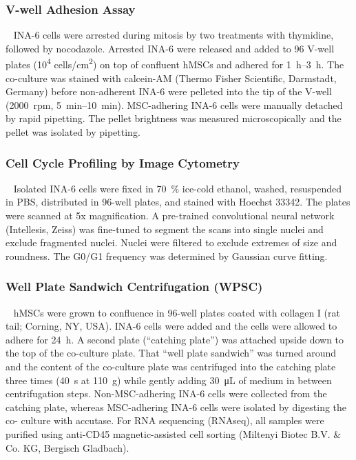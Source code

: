 \subsubsection*{V-well Adhesion Assay}
\ %
INA-6 cells were arrested during mitosis by two treatments with thymidine, followed by
nocodazole. Arrested INA-6 were released and added to 96 V-well plates (10\textsuperscript{4}
cells/cm\textsuperscript{2}) on
top of confluent hMSCs and adhered for \SIrange{1}{3}{\hour}. The co-culture was stained with calcein-AM
(Thermo Fisher Scientific, Darmstadt, Germany) before non-adherent INA-6 were pelleted
into the tip of the V-well (\SI{2000}{rpm}, \SIrange{5}{10}{\minute}). MSC-adhering INA-6 cells were manually
detached by rapid pipetting. The pellet brightness was measured microscopically and the
pellet was isolated by pipetting.


\subsubsection*{Cell Cycle Profiling by Image Cytometry}
\ %
Isolated INA-6 cells were fixed in \SI{70}{\percent} ice-cold ethanol, washed, resuspended in PBS,
distributed in 96-well plates, and stained with Hoechst 33342. The plates were scanned at 5x
magnification. A pre-trained convolutional neural network (Intellesis, Zeiss) was fine-tuned to
segment the scans into single nuclei and exclude fragmented nuclei. Nuclei were filtered to
exclude extremes of size and roundness. The G0/G1 frequency was determined by Gaussian
curve fitting.


\subsubsection*{Well Plate Sandwich Centrifugation (WPSC)}
\ %
hMSCs were grown to confluence in 96-well plates coated with collagen I (rat
tail; Corning, NY, USA). INA-6 cells were added and the cells were allowed to
adhere for \SI{24}{\hour}. A second plate (``catching plate'') was attached
upside down to the top of the co-culture plate. That ``well plate sandwich'' was
turned around and the content of the co-culture plate was centrifuged into the
catching plate three times (\SI{40}{\second} at \SI{110}{g}) while gently adding
\SI{30}{\micro\liter} of medium in between centrifugation steps.
Non-MSC-adhering INA-6 cells were collected from the catching plate, whereas
MSC-adhering INA-6 cells were isolated by digesting the co- culture with
accutase. For RNA sequencing (RNAseq), all samples were purified using anti-CD45
magnetic-assisted cell sorting (Miltenyi Biotec B.V. \& Co. KG, Bergisch
Gladbach).

